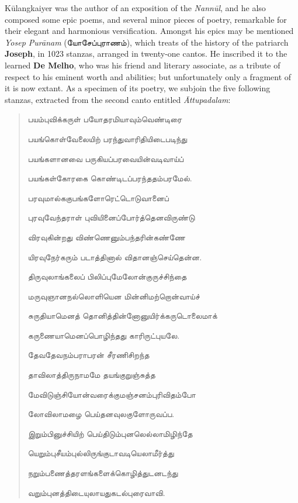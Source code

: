 \documentclass{article}
\newcommand{\TamilText}[1]{\texttamil{#1}}
\newcommand{\tam}[1]{\TamilText{#1}}
\begin{document}
K\={u}langkaiyer was the author of an exposition of the \emph{Nann\={u}l}, and he also composed some epic poems, and several minor pieces of poetry, remarkable for their elegant and harmonious versification. Amongst his epics may be mentioned \emph{Yosep Pur\={a}nam} (\tam{யோசேப்புராணம்}), which treats of the history of the patriarch \textbf{Joseph}, in 1023 stanzas, arranged in twenty-one cantos. He inscribed it to the learned \textbf{De Melho}, who was his friend and literary associate, as a tribute of respect to his eminent worth and abilities; but unfortunately only a fragment of it is now extant. As a specimen of its poetry, we subjoin the five following stanzas, extracted from the second canto entitled \emph{\={A}ttupadalam}:
\begin{quotation}\small
\tam{பயம்புவிக்கருள்‌ பயோதரமியாவும்வெண்டிரை}

\tam{பயங்கொள்வேலையிற்‌ பரந்துவாரிதியிடைபடிந்து}

\tam{பயங்களானவை பருகியப்பரவையின்வடிவாய்ப்‌}

\tam{பயங்கள்கோரகை கொண்டிடப்பரந்ததம்பரமேல்‌}.

\bigskip

\tam{பரவுமால்ககுபங்களோரெட்டொடுவானைப்‌}

\tam{புரவுவேந்தராள்‌ புவியினைப்போர்த்தெனவிருண்டு}

\tam{விரவுகின்றது விண்ணெனும்பந்தரின்கண்ணே}

\tam{யிரவுநேர்கரும்‌ படாத்தினால்‌ விதானஞ்செய்தென்ன}.

\bigskip

\tam{திருவுலாங்கலைப்‌ பிலிப்புமேலோன்குருச்சிந்தை}

\tam{மருவுஞானநல்லொளியென மின்னிமற்றொன்வாய்ச்‌}

\tam{சுருதியாமெனத் தொனித்தின்னோனுயிர்க்கருடொலைமாக்‌}

\tam{கருணையாமெனப்பொழிந்தது காரிருட்புயலே}.

\bigskip

\tam{தேவதேவநம்பராபரன்‌ சீரணிசிறந்த}

\tam{தாவிலாத்திருநாமமே தயங்குறுஞ்சுத்த}

\tam{மேவிடுஞ்சியோன்வரைக்குமஞ்சனம்புரிவிதம்போ}

\tam{லோவிலாமழை பெய்தனவுலகுளோருவப்ப}.

\bigskip

\tam{இறும்பினுச்சியிற்‌ பெய்திடும்புனலெல்லாமிழிந்தே}

\tam{யெறும்புசீயம்புல்லிருங்குடாவடியெலாமீர்த்து}

\tam{நறும்பணைத்தரளங்களைக்கொழித்துடனடந்து}

\tam{வறும்புனத்திடையுலாயதுகடல்புரைவாவி}.
\end{quotation}
\end{document}
